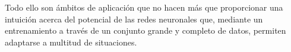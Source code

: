 Todo ello son ámbitos de aplicación que no hacen más que proporcionar una intuición acerca del potencial de las redes neuronales que, mediante un entrenamiento a través de un conjunto grande y completo de datos, permiten adaptarse a multitud de situaciones.\\

